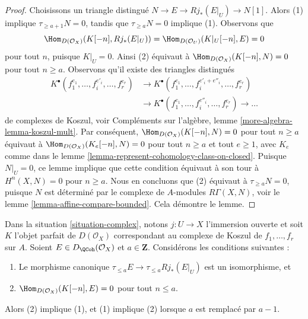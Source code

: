 \begin{proof}
Choisissons un triangle distingué $N \to E \to Rj_*(E|_U) \to N[1]$.
Alors (1) implique $\tau_{\geq a + 1} N = 0$, tandis que
$\tau_{\geq a}N = 0$ implique (1). Observons que
$$
\Hom_{D(\mathcal{O}_X)}(K[-n], Rj_*(E|_U)) =
\Hom_{D(\mathcal{O}_U)}(K|_U[-n], E) = 0
$$
pour tout $n$, puisque $K|_U = 0$. Ainsi (2) équivaut à
$\Hom_{D(\mathcal{O}_X)}(K[-n], N) = 0$ pour tout $n \geq a$. 
Observons qu'il existe des triangles distingués
$$
\begin{aligned}
K^\bullet(f_1^{e_1}, \ldots, f_i^{e'_i}, \ldots, f_r^{e_r}) &\to
K^\bullet(f_1^{e_1}, \ldots, f_i^{e'_i + e''_i}, \ldots, f_r^{e_r}) \\
{}&\to
K^\bullet(f_1^{e_1}, \ldots, f_i^{e''_i}, \ldots, f_r^{e_r}) \to \ldots
\end{aligned}
$$
de complexes de Koszul, voir
Compléments sur l'algèbre, lemme \ref{more-algebra-lemma-koszul-mult}. Par conséquent,
$\Hom_{D(\mathcal{O}_X)}(K[-n], N) = 0$ pour tout $n \geq a$
équivaut à
$\Hom_{D(\mathcal{O}_X)}(K_e[-n], N) = 0$ pour tout $n \geq a$ et
tout $e \geq 1$, avec $K_e$ comme dans le
lemme \ref{lemma-represent-cohomology-class-on-closed}.
Puisque $N|_U = 0$, ce lemme implique que cette condition équivaut à son tour à
$H^n(X, N) = 0$ pour $n \geq a$. Nous en concluons que (2) équivaut
à $\tau_{\geq a}N = 0$, puisque $N$ est déterminé par le complexe de
$A$-modules $R\Gamma(X, N)$, voir le lemme \ref{lemma-affine-compare-bounded}.
Cela démontre le lemme.
\end{proof}

\begin{lemma}
\label{lemma-orthogonal-koszul-second-variant}
Dans la situation \ref{situation-complex}, notons $j : U \to X$ l'immersion
ouverte et soit $K$ l'objet parfait de $D(\mathcal{O}_X)$
correspondant au complexe de Koszul de $f_1, \ldots, f_r$ sur $A$.
Soient $E \in D_\QCoh(\mathcal{O}_X)$ et $a \in \mathbf{Z}$. Considérons
les conditions suivantes :
\begin{enumerate}
\item Le morphisme canonique $\tau_{\leq a}E \to \tau_{\leq a} Rj_*(E|_U)$
est un isomorphisme, et
\item $\Hom_{D(\mathcal{O}_X)}(K[-n], E) = 0$ pour tout $n \leq a$.
\end{enumerate}
Alors (2) implique (1), et (1) implique (2) lorsque $a$ est remplacé par $a - 1$.
\end{lemma}

